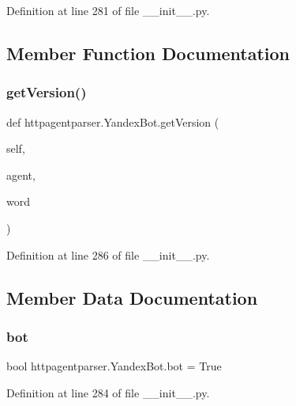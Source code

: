 Definition at line 281 of file \+\_\+\+\_\+init\+\_\+\+\_\+.\+py.



\subsection{Member Function Documentation}
\hypertarget{classhttpagentparser_1_1_yandex_bot_a96b226b5de52c7c66308525a4e174b90}{}\label{classhttpagentparser_1_1_yandex_bot_a96b226b5de52c7c66308525a4e174b90} 
\subsubsection{\texorpdfstring{get\+Version()}{getVersion()}}
{\footnotesize\ttfamily def httpagentparser.\+Yandex\+Bot.\+get\+Version (\begin{DoxyParamCaption}\item[{}]{self,  }\item[{}]{agent,  }\item[{}]{word }\end{DoxyParamCaption})}



Definition at line 286 of file \+\_\+\+\_\+init\+\_\+\+\_\+.\+py.



\subsection{Member Data Documentation}
\hypertarget{classhttpagentparser_1_1_yandex_bot_a1b6a651365f771d94114b55a6dd36073}{}\label{classhttpagentparser_1_1_yandex_bot_a1b6a651365f771d94114b55a6dd36073} 
\subsubsection{\texorpdfstring{bot}{bot}}
{\footnotesize\ttfamily bool httpagentparser.\+Yandex\+Bot.\+bot = True\hspace{0.3cm}{\ttfamily [static]}}



Definition at line 284 of file \+\_\+\+\_\+init\+\_\+\+\_\+.\+py.

